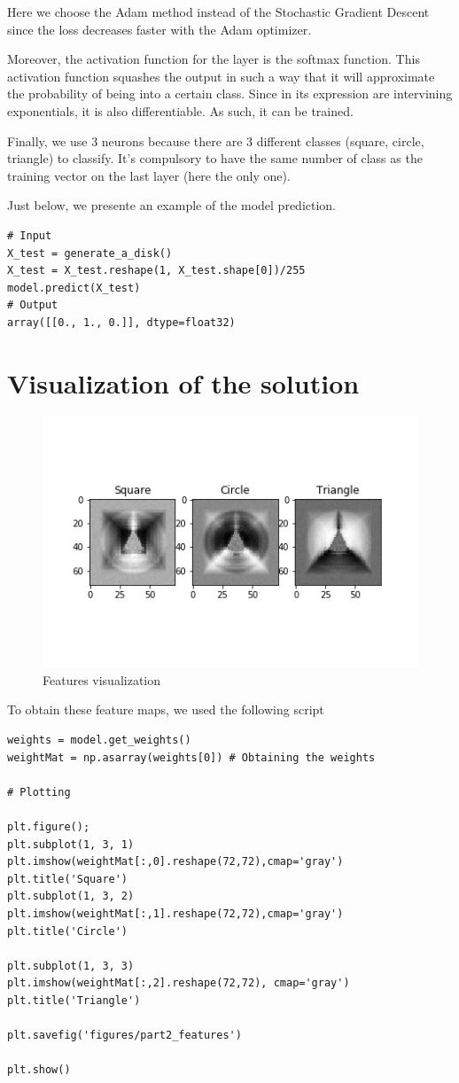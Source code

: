 \documentclass[]{article}
\begin{document}
Here we choose the Adam method instead of the Stochastic Gradient Descent since the loss decreases faster with the Adam optimizer.

Moreover, the activation function for the layer is the softmax function. This activation function squashes the output in such a way that it will approximate the probability of being into a certain class. Since in its expression are intervining exponentials, it is also differentiable. As such, it can be trained.

Finally, we use 3 neurons because there are 3 different classes (square, circle, triangle) to classify. It's compulsory to have the same number of class as the training vector on the last layer (here the only one).

Just below, we presente an example of the model prediction.

\begin{verbatim}
# Input
X_test = generate_a_disk()
X_test = X_test.reshape(1, X_test.shape[0])/255
model.predict(X_test)
# Output
array([[0., 1., 0.]], dtype=float32)
\end{verbatim}

\section{Visualization of the solution}

\begin{figure}[h!]

\includegraphics{figures/part2_features}
\caption{Features visualization}
\end{figure}

To obtain these feature maps, we used the following script

\begin{verbatim}
weights = model.get_weights()
weightMat = np.asarray(weights[0]) # Obtaining the weights

# Plotting 

plt.figure();
plt.subplot(1, 3, 1)
plt.imshow(weightMat[:,0].reshape(72,72),cmap='gray')
plt.title('Square')
plt.subplot(1, 3, 2)
plt.imshow(weightMat[:,1].reshape(72,72),cmap='gray')
plt.title('Circle')

plt.subplot(1, 3, 3)
plt.imshow(weightMat[:,2].reshape(72,72), cmap='gray')
plt.title('Triangle')

plt.savefig('figures/part2_features')

plt.show()
\end{verbatim}
\end{document}
